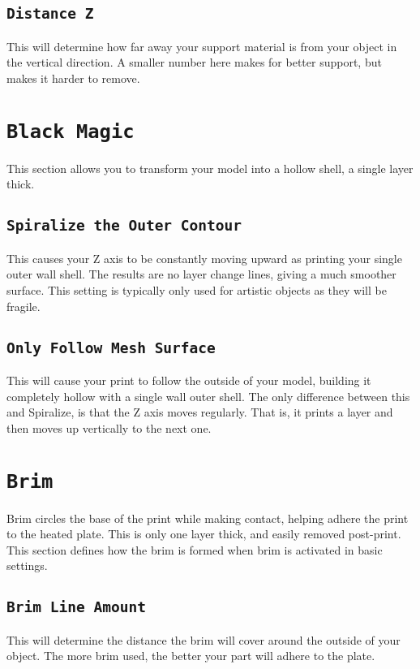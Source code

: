 \subsection{\texttt{Distance Z}}
This will determine how far away your support material is from your object in the vertical direction. A smaller number here makes for better support, but makes it harder to remove.

\section{\texttt{Black Magic}}
This section allows you to transform your model into a hollow shell, a single layer thick.

\subsection{\texttt{Spiralize the Outer Contour}}
This causes your Z axis to be constantly moving upward as printing your single outer wall shell. The results are no layer change lines, giving a much smoother surface. This setting is typically only used for artistic objects as they will be fragile.

\subsection{\texttt{Only Follow Mesh Surface}}
This will cause your print to follow the outside of your model, building it completely hollow with a single wall outer shell. The only difference between this and Spiralize, is that the Z axis moves regularly. That is, it prints a layer and then moves up vertically to the next one.

\section{\texttt{Brim}}
Brim circles the base of the print while making contact, helping adhere the print to the heated plate. This is only one layer thick, and easily removed post-print. This section defines how the brim is formed when brim is activated in basic settings.

\subsection{\texttt{Brim Line Amount}}
This will determine the distance the brim will cover around the outside of your object. The more brim used, the better your part will adhere to the plate. 

